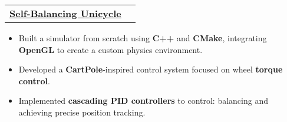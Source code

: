 \documentclass[letterpaper]{article}
\makeatletter
\newcommand{\resumeItem}[1]{
  \item\small{
    {#1 \vspace{-2pt}}
  }
}
\newcommand{\resumeProjectHeading}[2]{
    \item
    \begin{tabular*}{0.97\textwidth}{l@{\extracolsep{\fill}}r}
      \small#1 & #2 \\
    \end{tabular*}\vspace{-7pt}
}
\newcommand{\resumeProjectHeadingWithDetails}[4]{
    \item
    \begin{tabular*}{0.97\textwidth}{l@{\extracolsep{\fill}}r}
      \small#1 & #2 \\[5pt] %
      \textit{\small#3} & \textit{\small #4} \\
    \end{tabular*}\vspace{-7pt}
}
\newcommand{\resumeItemListStart}{\begin{itemize}}
\newcommand{\resumeItemListEnd}{\end{itemize}\vspace{-5pt}}
\makeatother
\begin{document}
  \resumeProjectHeading
    {\textbf{\href{https://gavintranquilino.com/self-balancing-unicycle}{\underline{Self-Balancing Unicycle}}} }{}
    \resumeItemListStart
      \resumeItem{Built a simulator from scratch using \textbf{C++} and \textbf{CMake}, integrating \textbf{OpenGL} to create a custom physics environment.}
      \resumeItem{Developed a \textbf{CartPole}-inspired control system focused on wheel \textbf{torque control}.}
      \resumeItem{Implemented \textbf{cascading PID controllers} to control: balancing and achieving precise position tracking.}
    \resumeItemListEnd




\end{document}
